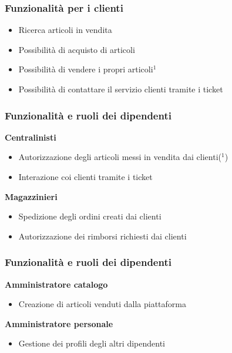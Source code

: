 \documentclass[12pt,a4paper]{beamer}
\begin{document}
\begin{frame}
\frametitle{Funzionalit\`a per i clienti}

\begin{itemize}
\item Ricerca articoli in vendita
\item Possibilit\`a di acquisto di articoli
\item Possibilit\`a di vendere i propri articoli$^1$
\item Possibilit\`a di contattare il servizio clienti tramite i ticket
\end{itemize}
\end{frame}

\begin{frame}
\frametitle{Funzionalit\`a e ruoli dei dipendenti}

\textbf{Centralinisti}
\begin{itemize}
\item Autorizzazione degli articoli messi in vendita dai clienti($^1$)
\item Interazione coi clienti tramite i ticket
\end{itemize}

\textbf{Magazzinieri}
\begin{itemize}
\item Spedizione degli ordini creati dai clienti
\item Autorizzazione dei rimborsi richiesti dai clienti
\end{itemize}
\end{frame}

\begin{frame}
\frametitle{Funzionalit\`a e ruoli dei dipendenti}

\textbf{Amministratore catalogo}
\begin{itemize}
\item Creazione di articoli venduti dalla piattaforma
\end{itemize}

\textbf{Amministratore personale}
\begin{itemize}
\item Gestione dei profili degli altri dipendenti
\end{itemize}
\end{frame}
\end{document}
